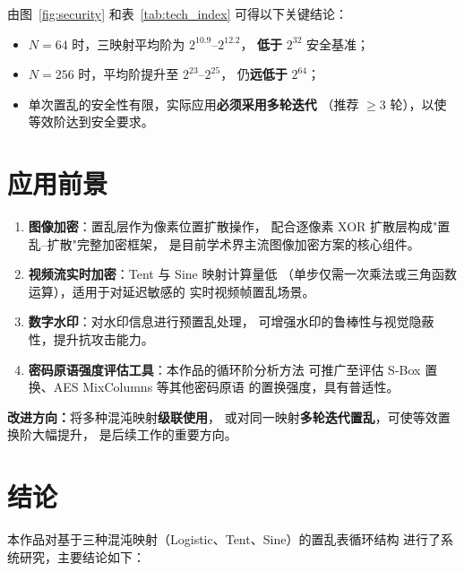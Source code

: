 \documentclass[12pt, a4paper]{article}
\begin{document}
由图~\ref{fig:security} 和表~\ref{tab:tech_index} 可得以下关键结论：
\begin{itemize}
  \item $N=64$ 时，三映射平均阶为 $2^{10.9}$--$2^{12.2}$，
        \textbf{低于} $2^{32}$ 安全基准；
  \item $N=256$ 时，平均阶提升至 $2^{23}$--$2^{25}$，
        仍\textbf{远低于} $2^{64}$；
  \item 单次置乱的安全性有限，实际应用\textbf{必须采用多轮迭代}
        （推荐 $\geq 3$ 轮），以使等效阶达到安全要求。
\end{itemize}

\section{应用前景}

\begin{enumerate}
  \item \textbf{图像加密}：置乱层作为像素位置扩散操作，
        配合逐像素 XOR 扩散层构成"置乱–扩散"完整加密框架，
        是目前学术界主流图像加密方案的核心组件。
  \item \textbf{视频流实时加密}：Tent 与 Sine 映射计算量低
        （单步仅需一次乘法或三角函数运算），适用于对延迟敏感的
        实时视频帧置乱场景。
  \item \textbf{数字水印}：对水印信息进行预置乱处理，
        可增强水印的鲁棒性与视觉隐蔽性，提升抗攻击能力。
  \item \textbf{密码原语强度评估工具}：本作品的循环阶分析方法
        可推广至评估 S-Box 置换、AES MixColumns 等其他密码原语
        的置换强度，具有普适性。
\end{enumerate}

\noindent\textbf{改进方向：}将多种混沌映射\textbf{级联使用}，
或对同一映射\textbf{多轮迭代置乱}，可使等效置换阶大幅提升，
是后续工作的重要方向。

\section{结论}

本作品对基于三种混沌映射（Logistic、Tent、Sine）的置乱表循环结构
进行了系统研究，主要结论如下：
\end{document}
